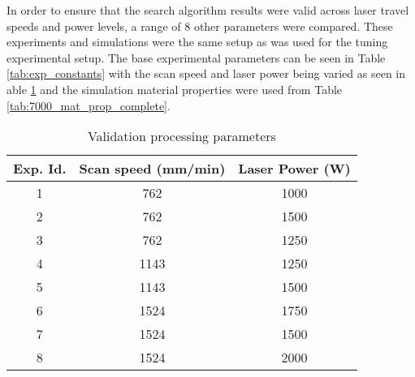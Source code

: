 \label{validation}

In order to ensure that the search algorithm results were valid across laser travel speeds and power levels, a range of 8 other parameters were compared.
These experiments and simulations were the same setup as was used for the tuning experimental setup.  The base experimental parameters can be seen in Table \ref{tab:exp_constants} with the scan speed and laser power being varied as seen in able \ref{tab:val_parameters} and the simulation material properties were used from Table \ref{tab:7000_mat_prop_complete}.

\begin{table}[!htb]
	\centering
	\caption{Validation processing parameters}
	\label{tab:val_parameters}
		\begin{tabular}{|c|c|c|} \hline 
			Exp. Id. & Scan speed (mm/min) & Laser Power (W) \\ \hline
			1 & 762 & 1000 \\ \hline  %
			2 & 762 & 1500 \\ \hline  %
			3 & 762 & 1250 \\ \hline  %
			4 & 1143 & 1250 \\ \hline %
			5 & 1143 & 1500 \\ \hline  %
			6 & 1524 & 1750 \\ \hline  %
			7 & 1524 & 1500 \\ \hline  %
			8 & 1524 & 2000 \\ \hline  %
		\end{tabular}
\end{table}


